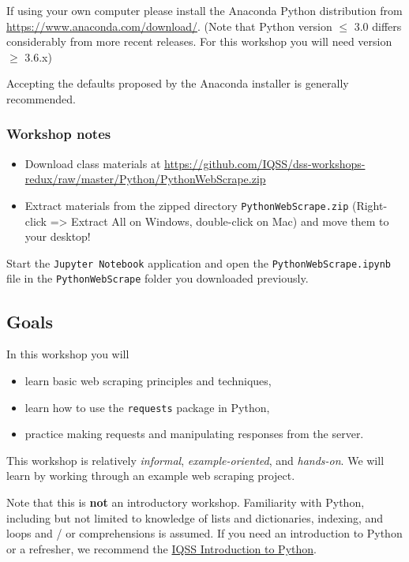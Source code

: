 \documentclass[]{book}
\providecommand{\tightlist}{%
  \setlength{\itemsep}{0pt}\setlength{\parskip}{0pt}}
\begin{document}
If using your own computer please install the Anaconda Python
distribution from \url{https://www.anaconda.com/download/}. (Note that
Python version \(\leq\) 3.0 differs considerably from more recent
releases. For this workshop you will need version \(\geq\) 3.6.x)

Accepting the defaults proposed by the Anaconda installer is generally
recommended.

\subsubsection{Workshop notes}\label{workshop-notes}

\begin{itemize}
\tightlist
\item
  Download class materials at
  \url{https://github.com/IQSS/dss-workshops-redux/raw/master/Python/PythonWebScrape.zip}
\item
  Extract materials from the zipped directory
  \texttt{PythonWebScrape.zip} (Right-click =\textgreater{} Extract All
  on Windows, double-click on Mac) and move them to your desktop!
\end{itemize}

Start the \texttt{Jupyter\ Notebook} application and open the
\texttt{PythonWebScrape.ipynb} file in the \texttt{PythonWebScrape}
folder you downloaded previously.

\subsection{Goals}\label{goals-5}

In this workshop you will

\begin{itemize}
\tightlist
\item
  learn basic web scraping principles and techniques,
\item
  learn how to use the \texttt{requests} package in Python,
\item
  practice making requests and manipulating responses from the server.
\end{itemize}

This workshop is relatively \emph{informal}, \emph{example-oriented},
and \emph{hands-on}. We will learn by working through an example web
scraping project.

Note that this is \textbf{not} an introductory workshop. Familiarity
with Python, including but not limited to knowledge of lists and
dictionaries, indexing, and loops and / or comprehensions is assumed. If
you need an introduction to Python or a refresher, we recommend the
\href{https://dss.iq.harvard.edu/workshop-materials\#widget-0}{IQSS
Introduction to Python}.
\end{document}
